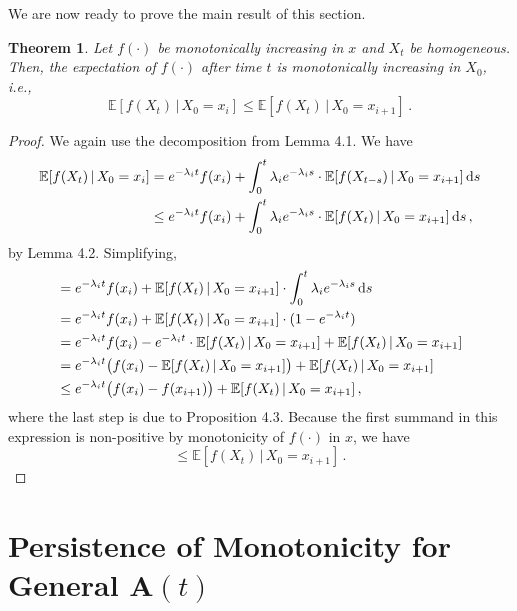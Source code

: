 \documentclass[10pt]{article}
\newtheorem{theorem}{Theorem}[section]
\newcommand{\dx}[1][x]{\text{\,d}#1}
\begin{document}
We are now ready to prove the main result of this section.
\begin{theorem}
Let $f(\cdot)$ be monotonically increasing in $x$ and $X_t$ be homogeneous. Then, the expectation of $f(\cdot)$ after time $t$ is monotonically increasing in $X_0$, i.e.,
\begin{equation*}
\mathbb{E}[f(X_t)\,\vert\,X_0=x_i] \leq \mathbb{E}[f(X_t)\,\vert\,X_0=x_{i+1}]\,.
\end{equation*}
\end{theorem}
\begin{proof}
We again use the decomposition from Lemma 4.1. We have
\begin{align*}
\mathbb{E}[f(X_t)\,\vert\,X_0=x_i] &= e^{-\lambda_i t}f(x_i) + \int_0^t \lambda_i e^{-\lambda_i s}\cdot\mathbb{E}[f(X_{t-s})\,\vert\,X_0=x_{i+1}]\dx[s] \\
 &\leq e^{-\lambda_i t}f(x_i) + \int_0^t \lambda_i e^{-\lambda_i s}\cdot\mathbb{E}[f(X_t)\,\vert\,X_0=x_{i+1}]\dx[s]\,,
\end{align*}
by Lemma 4.2. Simplifying,
\begin{align*}
 &= e^{-\lambda_i t}f(x_i) + \mathbb{E}[f(X_t)\,\vert\,X_0=x_{i+1}]\cdot\int_0^t \lambda_i e^{-\lambda_i s}\dx[s] \\
 &= e^{-\lambda_i t}f(x_i) + \mathbb{E}[f(X_t)\,\vert\,X_0=x_{i+1}]\cdot(1-e^{-\lambda_i t}) \\
 &= e^{-\lambda_i t}f(x_i) - e^{-\lambda_i t}\cdot\mathbb{E}[f(X_t)\,\vert\,X_0=x_{i+1}] + \mathbb{E}[f(X_t)\,\vert\,X_0=x_{i+1}] \\
 &= e^{-\lambda_i t}\bigl(f(x_i) - \mathbb{E}[f(X_t)\,\vert\,X_0=x_{i+1}]\bigr) + \mathbb{E}[f(X_t)\,\vert\,X_0=x_{i+1}]\\
 &\leq e^{-\lambda_i t}\bigl(f(x_i) - f(x_{i+1})\bigr) + \mathbb{E}[f(X_t)\,\vert\,X_0=x_{i+1}]\,,
\end{align*}
where the last step is due to Proposition 4.3. Because the first summand in this expression is non-positive by monotonicity of $f(\cdot)$ in $x$, we have
\begin{equation*}
\leq \mathbb{E}[f(X_t)\,\vert\,X_0=x_{i+1}]\,.
\end{equation*}
\end{proof}

\section{Persistence of Monotonicity for General $\mathbf{A}(t)$}
\end{document}
